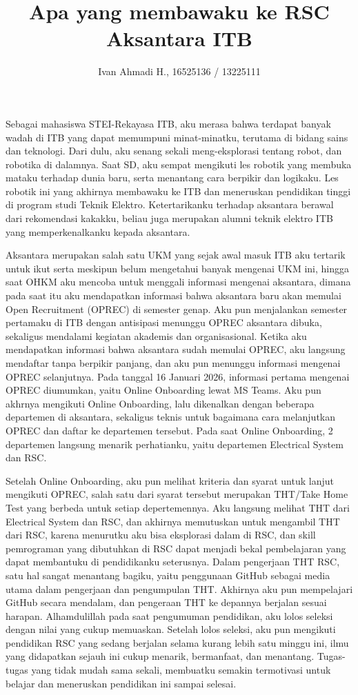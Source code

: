 \documentclass{article}
\title{Apa yang membawaku ke RSC Aksantara ITB}
\author{Ivan Ahmadi H., 16525136 / 13225111}
\begin{document}
\maketitle

Sebagai mahasiswa STEI-Rekayasa ITB, aku merasa bahwa terdapat banyak wadah di ITB yang dapat memumpuni minat-minatku, terutama di bidang sains dan teknologi.
Dari dulu, aku senang sekali meng-eksplorasi tentang robot, dan robotika di dalamnya. Saat SD, aku sempat mengikuti les robotik yang membuka mataku terhadap dunia baru, serta menantang cara berpikir dan logikaku. 
Les robotik ini yang akhirnya membawaku ke ITB dan meneruskan pendidikan tinggi di program studi Teknik Elektro. 
Ketertarikanku terhadap aksantara berawal dari rekomendasi kakakku, beliau juga merupakan alumni teknik elektro ITB yang memperkenalkanku kepada aksantara. 

Aksantara merupakan salah satu UKM yang sejak awal masuk ITB aku tertarik untuk ikut serta meskipun belum mengetahui banyak mengenai UKM ini, hingga saat OHKM aku mencoba untuk menggali informasi mengenai aksantara, dimana pada saat itu aku mendapatkan informasi bahwa aksantara baru akan memulai Open Recruitment (OPREC) di semester genap.
Aku pun menjalankan semester pertamaku di ITB dengan antisipasi menunggu OPREC aksantara dibuka, sekaligus mendalami kegiatan akademis dan organisasional.
Ketika aku mendapatkan informasi bahwa aksantara sudah memulai OPREC, aku langsung mendaftar tanpa berpikir panjang, dan aku pun menunggu informasi mengenai OPREC selanjutnya.
Pada tanggal 16 Januari 2026, informasi pertama mengenai OPREC diumumkan, yaitu Online Onboarding lewat MS Teams.
Aku pun akhrnya mengikuti Online Onboarding, lalu dikenalkan dengan beberapa departemen di aksantara, sekaligus teknis untuk bagaimana cara melanjutkan OPREC dan daftar ke departemen tersebut.
Pada saat Online Onboarding, 2 departemen langsung menarik perhatianku, yaitu departemen Electrical System dan RSC.

Setelah Online Onboarding, aku pun melihat kriteria dan syarat untuk lanjut mengikuti OPREC, salah satu dari syarat tersebut merupakan THT/Take Home Test yang berbeda untuk setiap depertemennya.
Aku langsung melihat THT dari Electrical System dan RSC, dan akhirnya memutuskan untuk mengambil THT dari RSC, karena menurutku aku bisa eksplorasi dalam di RSC, dan skill pemrograman yang dibutuhkan di RSC dapat menjadi bekal pembelajaran yang dapat membantuku di pendidikanku seterusnya.
Dalam pengerjaan THT RSC, satu hal sangat menantang bagiku, yaitu penggunaan GitHub sebagai media utama dalam pengerjaan dan pengumpulan THT.
Akhirnya aku pun mempelajari GitHub secara mendalam, dan pengeraan THT ke depannya berjalan sesuai harapan. Alhamdulillah pada saat pengumuman pendidikan, aku lolos seleksi dengan nilai yang cukup memuaskan.
Setelah lolos seleksi, aku pun mengikuti pendidikan RSC yang sedang berjalan selama kurang lebih satu minggu ini, ilmu yang didapatkan sejauh ini cukup menarik, bermanfaat, dan menantang.
Tugas-tugas yang tidak mudah sama sekali, membuatku semakin termotivasi untuk belajar dan meneruskan pendidikan ini sampai selesai.
\end{document}
